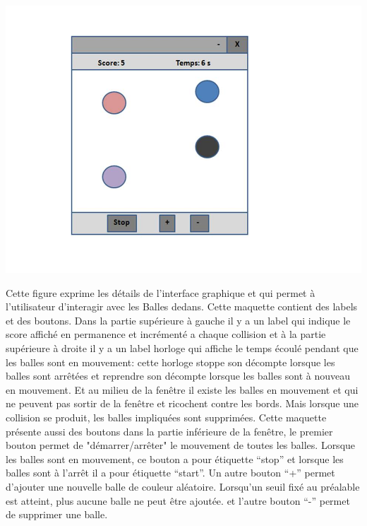 \documentclass{article}
\begin{document}
\begin{center}
  \includegraphics[scale=0.5]{yy.JPG}
\end{center}
Cette figure exprime les détails de l'interface graphique et qui permet à l'utilisateur d'interagir avec les Balles dedans. Cette maquette contient des labels et des boutons. Dans la partie supérieure à gauche il y a un label qui indique le score affiché en permanence et incrémenté a chaque collision et à la partie supérieure à droite il y a un label horloge qui affiche le temps écoulé pendant que les balles sont en mouvement: cette horloge stoppe son décompte lorsque les balles sont arrêtées et reprendre son décompte lorsque les balles sont à nouveau en mouvement. Et au milieu de la fenêtre il existe les balles en mouvement et qui ne peuvent pas sortir de la fenêtre et ricochent contre les bords. Mais lorsque une collision se produit, les balles impliquées sont supprimées.
Cette maquette présente aussi des boutons dans la partie inférieure de la fenêtre, le premier bouton permet de "démarrer/arrêter" le mouvement de toutes les balles. Lorsque les balles sont en mouvement, ce bouton a pour étiquette “stop” et lorsque les balles sont à l'arrêt il a pour étiquette “start”. Un autre bouton “+” permet d’ajouter une nouvelle balle de couleur aléatoire. Lorsqu’un seuil fixé au préalable est atteint, plus aucune balle ne peut être ajoutée. et l'autre bouton “-” permet de supprimer une balle.
\end{document}

